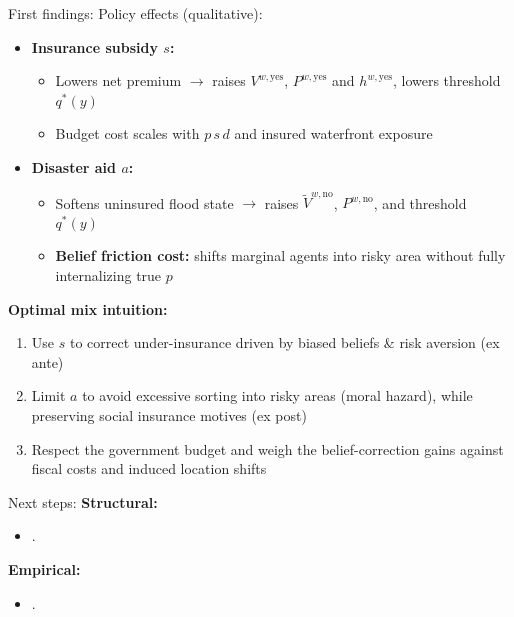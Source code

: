 \documentclass[xcolor=dvipsnames, aspectratio = 169]{beamer}
\begin{document}
{\begin{frame}{First findings: Policy effects (qualitative):}
\small
\begin{itemize}[leftmargin=-0.2cm]
  \item \textbf{Insurance subsidy $s$:}
  \begin{itemize}
    \item Lowers net premium $\rightarrow$ raises $V^{w,\text{yes}}$, $P^{w,\text{yes}}$ and $h^{w,\text{yes}}$, lowers threshold $q^*(y)$
    \item Budget cost scales with $p\,s\,d$ and insured waterfront exposure
  \end{itemize}
  \item \textbf{Disaster aid $a$:}
  \begin{itemize}
    \item Softens uninsured flood state $\rightarrow$ raises $\tilde V^{w,\text{no}}$, $P^{w,\text{no}}$, and threshold $q^*(y)$ 
    \item \textbf{Belief friction cost:} shifts marginal agents into risky area without fully internalizing true $p$
  \end{itemize}
\end{itemize}
\smallskip
\textbf{Optimal mix intuition:}
\begin{enumerate}[label=\arabic*.] 
  \item Use $s$ to correct under-insurance driven by biased beliefs \& risk aversion (ex ante)
  \item Limit $a$ to avoid excessive sorting into risky areas (moral hazard), while preserving social insurance motives (ex post)
  \item Respect the government budget and weigh the belief-correction gains against fiscal costs and induced location shifts
\end{enumerate}
\end{frame}

\begin{frame}{Next steps:}
\textbf{Structural:}
\begin{itemize}
  \item .
\end{itemize}

\textbf{Empirical:}
\begin{itemize}
  \item .
\end{itemize}

\end{frame}

}
\end{document}

